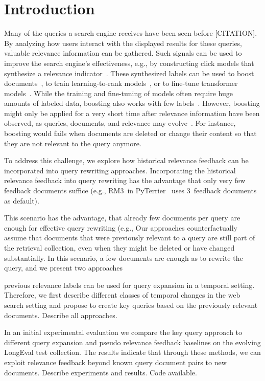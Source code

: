 \section{Introduction}

Many of the queries a search engine receives have been seen before {\color{red}[CITATION]}. By analyzing how users interact with the displayed results for these queries, valuable relevance information can be gathered. Such signals can be used to improve the search engine's effectiveness, e.g., by constructing click models that synthesize a relevance indicator~\cite{chuklin:2015}. These synthesized labels can be used to boost documents~\cite{keller:2024b}, to train learning-to-rank models~\cite{liu:2011}, or to fine-tune transformer models~\cite{lin:2021}. While the training and fine-tuning of models often require huge amounts of labeled data, boosting also works with few labels~\cite{keller:2024b}. However, boosting might only be applied for a very short time after relevance information have been observed, as queries, documents, and relevance may evolve~\cite{keller:2024}. For instance, boosting would fails when documents are deleted or change their content so that they are not relevant to the query anymore.

To address this challenge, we explore how historical relevance feedback can be incorporated into query rewriting approaches. Incorporating the historical relevance feedback into query rewriting has the advantage that only very few feedback documents suffice (e.g., RM3~in PyTerrier~\cite{macdonald:2020} uses 3~feedback documents as default).

This scenario has the advantage, that already few documents per query are enough for effective query rewriting (e.g.,  Our approaches counterfactually assume that documents that were previously relevant to a query are still part of the retrieval collection, even when they might be deleted or have changed substantially. In this scenario, a few documents are enough as to rewrite the query, and we present two approaches 

previous relevance labels can be used for query expansion in a temporal setting. Therefore, we first describe different classes of temporal changes in the web search setting and propose to create key queries based on the previously relevant documents. {\color{red} Describe all approaches.}

In an initial experimental evaluation we compare the key query approach to different query expansion and pseudo relevance feedback baselines on the evolving LongEval test collection. The results indicate that through these methods, we can exploit relevance feedback beyond known query document pairs to new documents. {\color{red} Describe experiments and results. Code available.}




